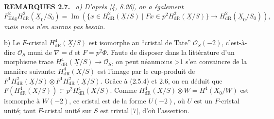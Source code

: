 \documentclass[10pt]{article}
\makeatletter
\newcommand{\Hdg}{\mathrm{Hdg}}
\newcommand{\UX}{\underline{X}}
\newcommand{\sourceanchor}[2]{\begingroup\def\@currentlabel{#2}\label{#1}\endgroup}
\newenvironment{sourcestatement}[3]{\par\smallskip\noindent\textbf{#1 #2.}\sourceanchor{#3}{#2}\ \itshape}{\par\normalfont\smallskip}
\newcommand{\DPage}[2]{\ifnum#1>1\clearpage\fi\setcounter{page}{#2}}
\makeatother
\begin{document}
\begin{sourcestatement}{REMARQUES}{2.7}{rem:2.7}
\noindent a) D'après [4, 8.26], on a également
\begin{equation}\tag{2.7.1}\label{eq:2.7.1}
F^2_{\Hdg}H^2_{\mathrm{dR}}(\UX_0/S_0)
=\operatorname{Im}\!\left(
\{x\in H^2_{\mathrm{dR}}(\UX/S)\mid Fx\in p^2H^2_{\mathrm{dR}}(\UX/S)\}
\longrightarrow H^2_{\mathrm{dR}}(\UX_0/S_0)\right),
\end{equation}
mais nous n'en aurons pas besoin.

\noindent b) Le $F$-cristal $H^4_{\mathrm{dR}}(\UX/S)$ est isomorphe au ``cristal de Tate'' $\mathcal O_S(-2)$, c'est-à-dire $\mathcal O_S$ muni de $\nabla=d$ et $F=p^2\Phi$. Faute de disposer dans la littérature d'un morphisme trace $H^4_{\mathrm{dR}}(\UX/S)\to\mathcal O_S$, on peut néanmoins
\DPage{15}{72}
s'en convaincre de la manière suivante: $H^4_{\mathrm{dR}}(\UX/S)$ est l'image par le cup-produit de $F^1H^2_{\mathrm{dR}}(\UX/S)\otimes F^1H^2_{\mathrm{dR}}(\UX/S)$. Grâce à (2.5.4) et 2.6, on en déduit que $F(H^4_{\mathrm{dR}}(\UX/S))\subset p^2H^4_{\mathrm{dR}}(\UX/S)$. Comme $H^4_{\mathrm{dR}}(\UX/S)\otimes W=H^4(X_0/W)$ est isomorphe à $W(-2)$, ce cristal est de la forme $U(-2)$, où $U$ est un $F$-cristal unité; tout $F$-cristal unité sur $S$ est trivial [7], d'où l'assertion.
\end{sourcestatement}
\end{document}
